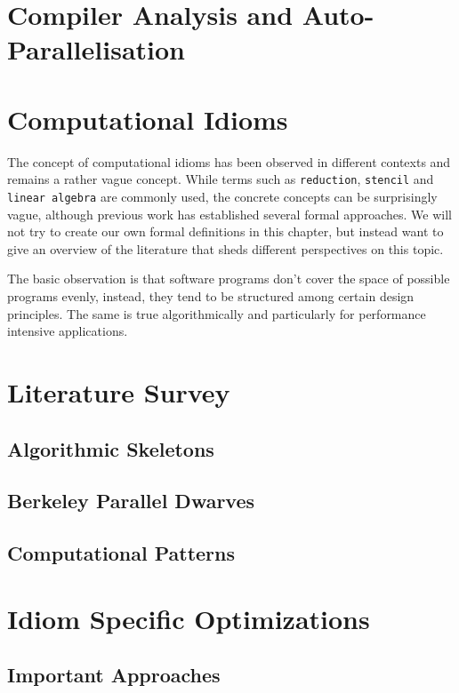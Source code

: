 
\section{Compiler Analysis and Auto-Parallelisation}


\section{Computational Idioms}

    The concept of computational idioms has been observed in different contexts
    and remains a rather vague concept.
    While terms such as \texttt{reduction}, \texttt{stencil} and
    \texttt{linear algebra} are commonly used, the concrete concepts can be
    surprisingly vague, although previous work has established several formal
    approaches.
    We will not try to create our own formal definitions in this chapter, but
    instead want to give an overview of the literature that sheds different
    perspectives on this topic.

    The basic observation is that software programs don't cover the space of
    possible programs evenly, instead, they tend to be structured among certain
    design principles.
    The same is true algorithmically and particularly for performance intensive
    applications.

\section{Literature Survey}

\subsection{Algorithmic Skeletons}

\subsection{Berkeley Parallel Dwarves}
\subsection{Computational Patterns}

\section{Idiom Specific Optimizations}

\subsection{Important Approaches}
